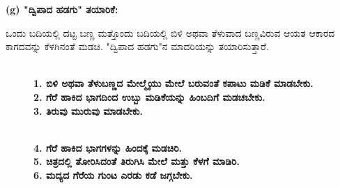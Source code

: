 \eject

\noindent
\textbf{(g) "ದ್ವಿಪಾದ ಹಡಗು" ತಯಾರಿಕೆ:}

ಒಂದು ಬದಿಯಲ್ಲಿ ದಟ್ಟ ಬಣ್ಣ ಮತ್ತೊಂದು ಬದಿಯಲ್ಲಿ ಬಿಳಿ ಅಥವಾ ತೆಳುವಾದ ಬಣ್ಣವಿರುವ ಆಯತ ಆಕಾರದ ಕಾಗದವನ್ನು ಕೆಳಗಿನಂತೆ ಮಡಚಿ. "ದ್ವಿಪಾದ ಹಡಗು"ನ ಮಾದರಿಯನ್ನು ತಯಾರಿಸುತ್ತಾರೆ. 
\begin{figure}[H]
\\
\textbf{1. ಬಿಳಿ ಅಥವಾ ತೆಳುಬಣ್ಣದ ಮೇಲ್ಮೈಯು ಮೇಲೆ ಬರುವಂತೆ ಕಪಾಟು ಮಡಿಕೆ ಮಾಡಬೇಕು.}\\
\textbf{2. ಗೆರೆ ಹಾಕಿದ ಭಾಗದಿಂದ ಉಬ್ಬು ಮಡಿಕೆಯನ್ನು ಹಿಂಬದಿಗೆ ಮಡಚಬೇಕು.}\\
\textbf{3. ತಿರುವು ಮುರುವು ಮಾಡಬೇಕು.}
\end{figure}
\begin{figure}[H]
\\
\textbf{4. ಗೆರೆ ಹಾಕಿದ ಭಾಗಗಳನ್ನು ಹಿಂದಕ್ಕೆ ಮಡಚಿರಿ.}\\
\textbf{5. ಚಿತ್ರದಲ್ಲಿ ತೋರಿಸಿದಂತೆ ತಿರುಗಿಸಿ ಮೇಲೆ ಮತ್ತು ಕೆಳಗೆ ಮಾಡಿರಿ.}\\
\textbf{6. ಮದ್ಯದ ಗೆರೆಯ ಗುಂಟ ಎರಡು ಕಡೆ ಜಗ್ಗಬೇಕು.}
\end{figure}

\newpage

